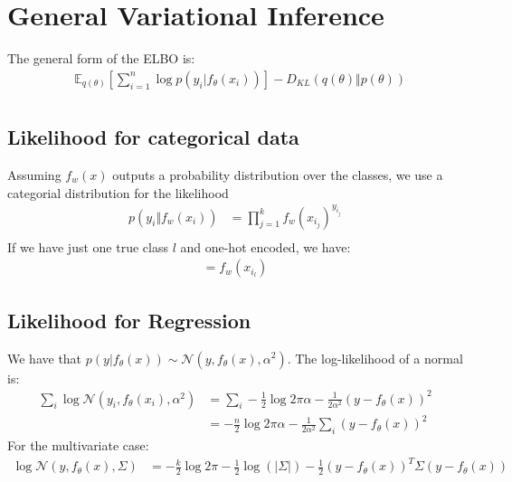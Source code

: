 \documentclass[a4paper]{scrartcl}
\begin{document}
\section{General Variational Inference}
    The general form of the ELBO is:
    \begin{align*}
        & \mathbb{E}_{q(\theta)}[\sum_{i=1}^n \log{p(y_i \vert f_{\theta}(x_i))}] - D_{KL}(q(\theta) \Vert p(\theta))\\
    \end{align*}

  \subsection{Likelihood for categorical data}
      Assuming $f_w(x)$ outputs a probability distribution over the classes, we use a categorial distribution for the likelihood
      \begin{align*}
          p(y_i \Vert f_w(x_i))
          &= \prod_{j=1}^k f_w(x_{i_j})^{y_{i_j}} \\
      \end{align*}
      If we have just one true class $l$ and one-hot encoded, we have:
      \begin{align*}
          = f_w(x_{i_l})
      \end{align*}

    \subsection{Likelihood for Regression}
      We have that $p(y \vert f_{\theta}(x)) \sim \mathcal{N}(y,
      f_{\theta}(x), \alpha^2)$. The log-likelihood of a normal is:
      \begin{align*}
        \sum_i \log{\mathcal{N}(y_i,f_{\theta}(x_i), \alpha^2)}
        &= \sum_i -\frac{1}{2}\log{2\pi \alpha} - \frac{1}{2\alpha^2} (y- f_{\theta}(x))^2\\
        &= -\frac{n}{2}\log{2\pi \alpha} - \frac{1}{2\alpha^2} \sum_i (y- f_{\theta}(x))^2
      \end{align*}
      For the multivariate case:
      \begin{align*}
        \log{\mathcal{N}(y,f_{\theta}(x), \Sigma)}
        &= -\frac{k}{2}\log{2\pi} - \frac{1}{2} \log(\vert \Sigma \vert) - \frac{1}{2}(y - f_{\theta}(x))^T \Sigma (y - f_{\theta}(x))
      \end{align*}
\end{document}

